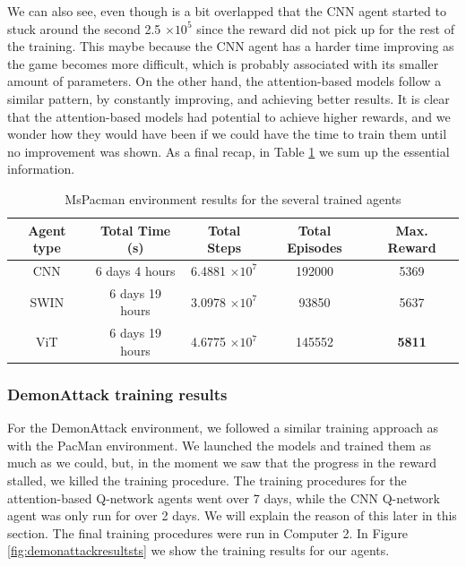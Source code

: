 We can also see, even though is a bit overlapped that the CNN agent started to stuck around the second 2.5 $\times 10^5$ since the reward did not pick up for the rest of the training. This maybe because the CNN agent has a harder time improving as the game becomes more difficult, which is probably associated with its smaller amount of parameters. On the other hand, the attention-based models follow a similar pattern, by constantly improving, and achieving better results. It is clear that the attention-based models had potential to achieve higher rewards, and we wonder how they would have been if we could have the time to train them until no improvement was shown. As a final recap, in Table \ref{tab:pacman_trainingresults} we sum up the essential information.


\begin{table}[!h]
	\begin{center}
			\caption[MsPacman environment results for the several trained agents]{MsPacman environment results for the several trained agents}
			\label{tab:pacman_trainingresults}
			\begin{tabular}{||c c c c | c||} 
					\hline
					Agent type & Total Time (s) & Total Steps & Total Episodes & Max. Reward \\ [0.5ex] 
					\hline\hline
					CNN & 6 days 4 hours& 6.4881 $\times 10^7$ & 192000 & 5369 \\ 
					\hline
					SWIN & 6 days 19 hours & 3.0978 $\times 10^7$ &  93850 & 5637 \\
					\hline
					ViT & 6 days 19 hours & 4.6775 $\times 10^7$ &  145552 & \textbf{5811} \\
					\hline
				\end{tabular}
		\end{center}
\end{table}

\subsubsection{DemonAttack training results}
\label{sec:demon-attack-training-results}

For the DemonAttack environment, we followed a similar training approach as with the PacMan environment.  We launched the models and trained them as much as we could, but, in the moment we saw that the progress in the reward stalled, we killed the training procedure. The training procedures for the attention-based Q-network agents went over 7 days, while the CNN Q-network agent was only run for over 2 days. We will explain the reason of this later in this section. The final training procedures were run in Computer 2. In Figure \ref{fig:demonattackresultsts} we show the training results for our agents. 

